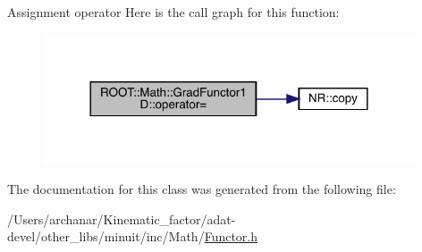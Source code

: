 Assignment operator Here is the call graph for this function\+:
\nopagebreak
\begin{figure}[H]
\begin{center}
\leavevmode
\includegraphics[width=312pt]{d3/d76/classROOT_1_1Math_1_1GradFunctor1D_a3ea006d92100ba76a6fae9f57499c60d_cgraph}
\end{center}
\end{figure}


The documentation for this class was generated from the following file\+:\begin{DoxyCompactItemize}
\item 
/\+Users/archanar/\+Kinematic\+\_\+factor/adat-\/devel/other\+\_\+libs/minuit/inc/\+Math/\mbox{\hyperlink{adat-devel_2other__libs_2minuit_2inc_2Math_2Functor_8h}{Functor.\+h}}\end{DoxyCompactItemize}
